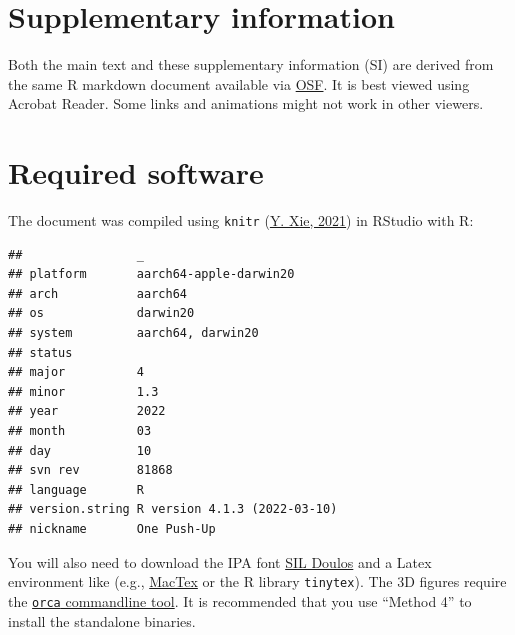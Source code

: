 \documentclass[
  11pt,
  man,floatsintext]{apa6}
\begin{document}
\endgroup

\newpage
\renewcommand{\thesection}{\S \arabic{section}}

\hypertarget{supplementary-information}{%
\section*{Supplementary information}\label{supplementary-information}}

\setcounter{section}{1}

Both the main text and these supplementary information (SI) are derived from the same R markdown document available via \href{https://osf.io/q7gjp/}{OSF}. It is best viewed using Acrobat Reader. Some links and animations might not work in other viewers.

\hypertarget{sec:SI-software}{%
\section{Required software}\label{sec:SI-software}}

The document was compiled using \texttt{knitr} (\protect\hyperlink{ref-xie2021}{Y. Xie, 2021}) in RStudio with R:

\begin{verbatim}
##                _                           
## platform       aarch64-apple-darwin20      
## arch           aarch64                     
## os             darwin20                    
## system         aarch64, darwin20           
## status                                     
## major          4                           
## minor          1.3                         
## year           2022                        
## month          03                          
## day            10                          
## svn rev        81868                       
## language       R                           
## version.string R version 4.1.3 (2022-03-10)
## nickname       One Push-Up
\end{verbatim}

You will also need to download the IPA font \href{https://software.sil.org/doulos/download/}{SIL Doulos} and a Latex environment like (e.g., \href{https://tug.org/mactex/mactex-download.html}{MacTex} or the R library \texttt{tinytex}). The 3D figures require the \href{https://github.com/plotly/orca\#installation}{\texttt{orca} commandline tool}. It is recommended that you use ``Method 4'' to install the standalone binaries.
\end{document}
